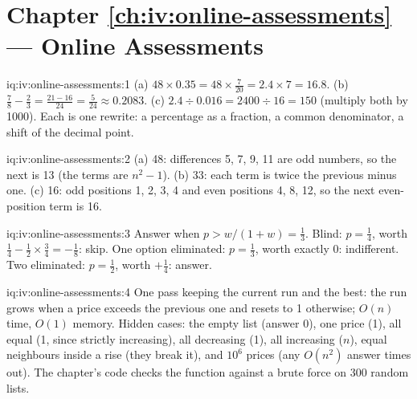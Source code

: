 \section*{Chapter \ref{ch:iv:online-assessments} --- Online Assessments}

\begin{solution}{iq:iv:online-assessments:1}
(a) $48 \times 0.35 = 48 \times \tfrac{7}{20} = 2.4 \times 7 = 16.8$. (b) $\tfrac78 - \tfrac23 = \tfrac{21 -
16}{24} = \tfrac{5}{24} \approx 0.2083$. (c) $2.4 \div 0.016 = 2400 \div 16 = 150$ (multiply both by 1000).
Each is one rewrite: a percentage as a fraction, a common denominator, a shift of the decimal point.
\end{solution}

\begin{solution}{iq:iv:online-assessments:2}
(a) 48: differences 5, 7, 9, 11 are odd numbers, so the next is 13 (the terms are $n^2 - 1$). (b) 33: each
term is twice the previous minus one. (c) 16: odd positions 1, 2, 3, 4 and even positions 4, 8, 12, so the next
even-position term is 16.
\end{solution}

\begin{solution}{iq:iv:online-assessments:3}
Answer when $p > w/(1 + w) = \tfrac13$. Blind: $p = \tfrac14$, worth $\tfrac14 - \tfrac12 \times \tfrac34 =
-\tfrac18$: skip. One option eliminated: $p = \tfrac13$, worth exactly 0: indifferent. Two eliminated: $p =
\tfrac12$, worth $+\tfrac14$: answer.
\end{solution}

\begin{solution}{iq:iv:online-assessments:4}
One pass keeping the current run and the best: the run grows when a price exceeds the previous one and resets
to 1 otherwise; $O(n)$ time, $O(1)$ memory. Hidden cases: the empty list (answer 0), one price (1), all equal
(1, since strictly increasing), all decreasing (1), all increasing ($n$), equal neighbours inside a rise
(they break it), and $10^6$ prices (any $O(n^2)$ answer times out). The chapter's code checks the function
against a brute force on 300 random lists.
\end{solution}

